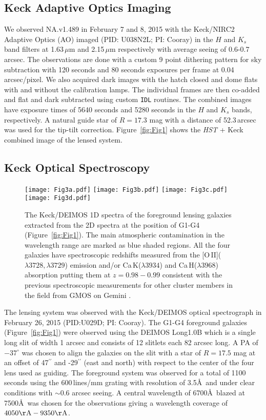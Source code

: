 \documentclass[iop,apj,useAMS,usenatbib]{emulateapj-rtx4}
\begin{document}
\subsection{Keck Adaptive Optics Imaging}

We observed NA.v1.489 in February 7 and 8, 2015 with the Keck/NIRC2
Adaptive Optics (AO) imaged (PID: U038N2L; PI: Cooray) in the $H$ and
$K_s$ band filters at 1.63\,$\mu$m and 2.15\,$\mu$m respectively with average seeing
of 0.6-0.7\,arcsec. The observations are done with a custom 9 point
dithering pattern for sky subtraction with 120 seconds and 80 seconds
exposures per frame at 0.04 arcsec/pixel. We
also acquired dark images with the hatch
closed and dome flats with and without the calibration lamps. The
individual frames are then co-added and flat and dark subtracted using
custom \texttt{IDL} routines. The combined images have exposure times
of 5640 seconds and 5280 seconds in the $H$ and $K_s$ bands, respectively. A natural guide
star of $R=17.3$ mag with a distance of 52.3\,arcsec was used for the
tip-tilt correction. Figure~\ref{fig:Fig1} shows the {\it HST} + Keck
combined image of the lensed system.


\subsection{Keck Optical Spectroscopy}

\begin{figure}
\centering
\leavevmode
\texttt{[image: Fig3a.pdf]} 
\texttt{[image: Fig3b.pdf]} 
\texttt{[image: Fig3c.pdf]} 
\texttt{[image: Fig3d.pdf]} 
\caption{The Keck/DEIMOS 1D spectra of the foreground lensing galaxies
  extracted from the 2D spectra at the position of G1-G4
  (Figure~\ref{fig:Fig1}). The main atmospheric contamination in the
  wavelength range are marked as blue shaded regions. All the four
  galaxies have spectroscopic redshifts measured from the
  [O\,II]($\lambda3728, \lambda3729$) emission and/or
  Ca\,K($\lambda3934$) and Ca\,H($\lambda3968$) absorption putting them at
  $z=0.98-0.99$ consistent with the previous spectroscopic
  measurements for other cluster members in the field from GMOS on Gemini \citep{Stanford2014}.}
\label{fig:Fig3}
\end{figure}

The lensing system was observed with the Keck/DEIMOS optical
spectrograph \citep{Faber2003} in February 26, 2015 (PID:U029D; PI: Cooray). The G1-G4 foreground
galaxies (Figure~\ref{fig:Fig1}) were observed using the DEIMOS Long1.0B which is a single long slit of width 1 arcsec and
consists of 12 slitlets each 82 arcsec long. A PA of $-37^{\circ}$ was chosen to
align the galaxies on the slit with a star of $R=17.5$ mag at an offset
of 47$^{\prime\prime}$ and -29$^{\prime\prime}$ (east and north) with
respect to the center of the four lens used as
guiding. The foreground system was observed for
a total of 1100 seconds using the 600\,lines/mm grating with resolution of
3.5\AA\ and under clear conditions with $\sim$0.6 arcsec seeing. A central wavelength of 6700\AA\
blazed at 7500\AA\ was chosen for the observations giving a wavelength coverage of
${\rm 4050\AA - 9350\AA}$. 
\end{document}
